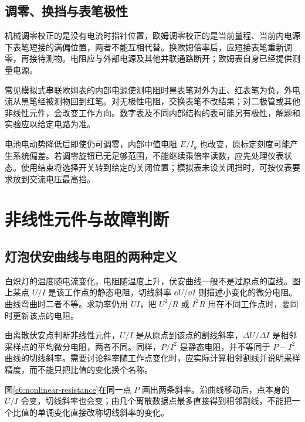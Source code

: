 \subsection{调零、换挡与表笔极性}

机械调零校正的是没有电流时指针位置，欧姆调零校正的是当前量程、当前内电源下表笔短接的满偏位置，两者不能互相代替。换欧姆倍率后，应短接表笔重新调零，再接待测物。电阻应与外部电源及其他并联通路断开；欧姆表自身已经提供测量电源。

常见模拟式串联欧姆表的内部电源使测电阻时黑表笔对外为正、红表笔为负，外电流从黑笔经被测物回到红笔。对无极性电阻，交换表笔不改结果；对二极管或其他非线性元件，会改变工作方向。数字表及不同内部结构的表可能另有极性，解题和实验应以给定电路为准。

电池电动势降低后即使仍可调零，内部中值电阻 $E/I_g$ 也改变，原标定刻度可能产生系统偏差。若调零旋钮已无足够范围，不能继续乘倍率读数，应先处理仪表状态。使用结束将选择开关转到给定的关闭位置；模拟表未设关闭挡时，可按仪表要求放到交流电压最高挡。


\section{非线性元件与故障判断}
\subsection{灯泡伏安曲线与电阻的两种定义}

白炽灯的温度随电流变化，电阻随温度上升，伏安曲线一般不是过原点的直线。图上某点 $U/I$ 是该工作点的静态电阻，切线斜率 $\dd U/\dd I$ 则描述小变化的微分电阻。曲线弯曲时二者不等。求功率仍用 $UI$，把 $U^2/R$ 或 $I^2R$ 用在不同工作点时，要同时更新该点的电阻。

由离散伏安点判断非线性元件，$U/I$ 是从原点到该点的割线斜率，$\Delta U/\Delta I$ 是相邻采样点的平均微分电阻，两者不同。同样，$P/I^2$ 是静态电阻，并不等同于 $P-I^2$ 曲线的切线斜率。需要讨论斜率随工作点变化时，应实际计算相邻割线并说明采样精度，而不能只把比值的变化换个名称。

图\ref{c6:nonlinear-resistance}在同一点 $P$ 画出两条斜率。沿曲线移动后，点本身的 $U/I$ 会变，切线斜率也会变；由几个离散数据点最多直接得到相邻割线，不能把一个比值的单调变化直接改称切线斜率的变化。

